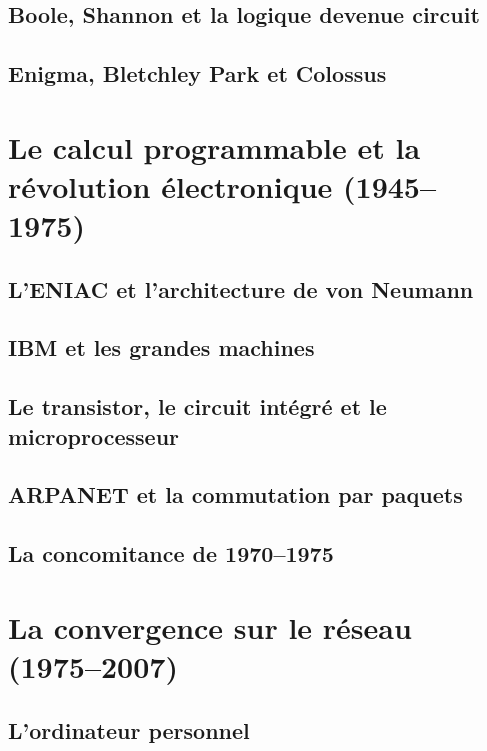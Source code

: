 \subsection{Boole, Shannon et la logique devenue circuit}\label{subsec:shannon}

\subsection{Enigma, Bletchley Park et Colossus}\label{subsec:enigma}


\section{Le calcul programmable et la révolution électronique (1945--1975)}\label{sec:computing}

\subsection{L'ENIAC et l'architecture de von Neumann}\label{subsec:eniac}

\subsection{IBM et les grandes machines}\label{subsec:mainframe}

\subsection{Le transistor, le circuit intégré et le microprocesseur}\label{subsec:transistor}

\subsection{ARPANET et la commutation par paquets}\label{subsec:arpanet}

\subsection{La concomitance de 1970--1975}\label{subsec:bascule}


\section{La convergence sur le réseau (1975--2007)}\label{sec:convergence}

\subsection{L'ordinateur personnel}\label{subsec:pc}

